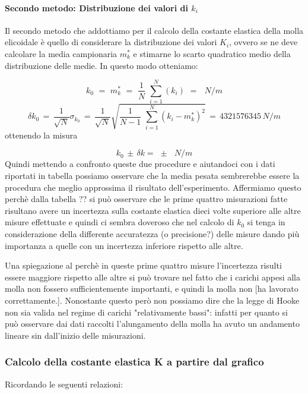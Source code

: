 \paragraph{Secondo metodo: Distribuzione dei valori di $k_i$\\}
Il secondo metodo che addottiamo per il calcolo della costante elastica della molla elicoidale è quello di considerare la distribuzione dei valori $K_i$, ovvero se ne deve calcolare la media campionaria $m^*_k$ e stimarne lo scarto quadratico medio della distribuzione delle medie. In questo modo otteniamo:

\begin{equation*}
	k_0 \,\,=\,\, m^*_k \,\,=\,\, \frac{1}{N}\,\,\sum_{i=1}^{N} (k_i) \,\,=\,\,  \,\,N/m
\end{equation*}
%
\begin{equation*}
	\delta k_0  \,=\, \frac{1}{\sqrt{N}} \sigma_{k_0} \,=\, \frac{1}{\sqrt{N}}\sqrt{\frac{1}{N - 1}\,\,\sum_{i=1}^{N} (k_i - m^*_k)^2}\,=\, 4321576345 \,N/m
\end{equation*}
%
ottenendo la misura

\begin{equation}
		k_0 \, \pm \, \delta k =  \,\, \pm \,\,  \,\, N/m
\end{equation}
%
Quindi mettendo a confronto queste due procedure e aiutandoci con i dati riportati in tabella possiamo osservare che la media pesata sembrerebbe essere la procedura che meglio approssima il risultato dell'esperimento. Affermiamo questo perchè dalla tabella ?? si può osservare che le prime quattro misurazioni fatte risultano avere un incertezza sulla costante elastica dieci volte superiore alle altre misure effettuate e quindi ci sembra doveroso che nel calcolo di $k_0$ si tenga in considerazione della differente accuratezza (o precisione?) delle misure dando più importanza a quelle con un incertezza inferiore rispetto alle altre.

Una spiegazione al perchè in queste prime quattro misure l'incertezza risulti essere maggiore rispetto alle altre si può trovare nel fatto che i carichi appesi alla molla non fossero sufficientemente importanti, e quindi la molla non [ha lavorato correttamente.]. Nonostante questo però non possiamo dire che la legge di Hooke non sia valida nel regime di carichi "relativamente bassi": infatti per quanto si può osservare dai dati raccolti l'alungamento della molla ha avuto un andamento lineare sin dall'inizio delle misurazioni.

\subsubsection{Calcolo della costante elastica K a partire dal grafico}
Ricordando le seguenti relazioni:

